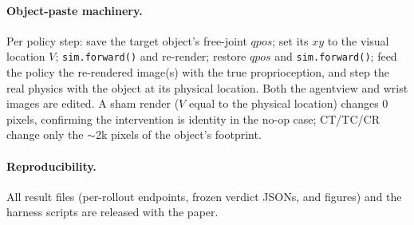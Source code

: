 \paragraph{Object-paste machinery.} Per policy step: save the target object's free-joint $qpos$; set its $xy$ to the visual location $V$; \texttt{sim.forward()} and re-render; restore $qpos$ and \texttt{sim.forward()}; feed the policy the re-rendered image(s) with the true proprioception, and step the real physics with the object at its physical location. Both the agentview and wrist images are edited. A sham render ($V$ equal to the physical location) changes $0$ pixels, confirming the intervention is identity in the no-op case; CT/TC/CR change only the $\sim$2k pixels of the object's footprint.

\paragraph{Reproducibility.} All result files (per-rollout endpoints, frozen verdict JSONs, and figures) and the harness scripts are released with the paper.
